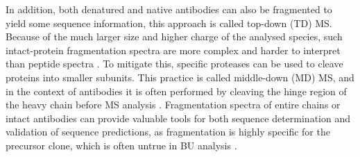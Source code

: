 In addition, both denatured and native antibodies can also be fragmented to yield some sequence information, this approach is called top-down (TD) MS. Because of the much larger size and higher charge of the analysed species, such intact-protein fragmentation spectra are more complex and harder to interpret than peptide spectra \cite{toby2016progress, compton2011on}. To mitigate this, specific proteases can be used to cleave proteins into smaller subunits. This practice is called middle-down (MD) MS, and in the context of antibodies it is often performed by cleaving the hinge region of the heavy chain before MS analysis \cite{johansson2008ides:}. Fragmentation spectra of entire chains or intact antibodies can provide valuable tools for both sequence determination and validation of sequence predictions, as fragmentation is highly specific for the precursor clone, which is often untrue in BU analysis \cite{fornelli2014middle-down}.

